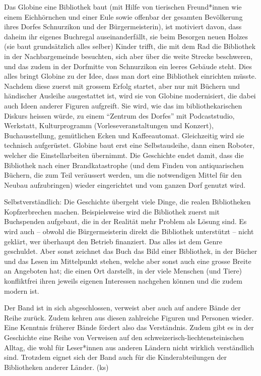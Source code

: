 \documentclass[a4paper,
fontsize=11pt,
oneside,
numbers=noperiodatend,
parskip=half-,
bibliography=totoc,
final
]{scrartcl}
\begin{document}
Das Globine eine Bibliothek baut (mit Hilfe von tierischen Freund*innen
wie einem Eichhörnchen und einer Eule sowie offenbar der gesamten
Bevölkerung ihres Dorfes Schnurzikon und der Bürgermeisterin), ist
motiviert davon, dass daheim ihr eigenes Buchregal auseinanderfällt, sie
beim Besorgen neuen Holzes (sie baut grundsätzlich alles selber) Kinder
trifft, die mit dem Rad die Bibliothek in der Nachbargemeinde besuchten,
sich aber über die weite Strecke beschweren, und das zudem in der
Dorfmitte von Schnurzikon ein leeres Gebäude steht. Dies alles bringt
Globine zu der Idee, dass man dort eine Bibliothek einrichten müsste.
Nachdem diese zuerst mit grossem Erfolg startet, aber nur mit Büchern
und händischer Ausleihe ausgestattet ist, wird sie von Globine
modernisiert, die dabei auch Ideen anderer Figuren aufgreift. Sie wird,
wie das im bibliothekarischen Diskurs heissen würde, zu einem
\enquote{Zentrum des Dorfes} mit Podcaststudio, Werkstatt,
Kulturprogramm (Vorleseveranstaltungen und Konzert), Buchausstellung,
gemütlichen Ecken und Kaffeeautomat. Gleichzeitig wird sie technisch
aufgerüstet. Globine baut erst eine Selbstausleihe, dann einen Roboter,
welcher die Einstellarbeiten übernimmt. Die Geschichte endet damit, dass
die Bibliothek nach einer Brandkatastrophe (und dem Finden von
antiquarischen Büchern, die zum Teil veräussert werden, um die
notwendigen Mittel für den Neubau aufzubringen) wieder eingerichtet und
vom ganzen Dorf genutzt wird.

Selbstverständlich: Die Geschichte übergeht viele Dinge, die realen
Bibliotheken Kopfzerbrechen machen. Beispielsweise wird die Bibliothek
zuerst mit Buchspenden aufgebaut, die in der Realität mehr Problem als
Lösung sind. Es wird auch -- obwohl die Bürgermeisterin direkt die
Bibliothek unterstützt -- nicht geklärt, wer überhaupt den Betrieb
finanziert. Das alles ist dem Genre geschuldet. Aber sonst zeichnet das
Buch das Bild einer Bibliothek, in der Bücher und das Lesen im
Mittelpunkt stehen, welche aber sonst auch eine grosse Breite an
Angeboten hat; die einen Ort darstellt, in der viele Menschen (und
Tiere) konfliktfrei ihren jeweils eigenen Interessen nachgehen können
und die zudem modern ist.

Der Band ist in sich abgeschlossen, verweist aber auch auf andere Bände
der Reihe zurück. Zudem kehren aus diesen zahlreiche Figuren und
Personen wieder. Eine Kenntnis früherer Bände fördert also das
Verständnis. Zudem gibt es in der Geschichte eine Reihe von Verweisen
auf den schweizerisch-liechtensteinischen Alltag, die wohl für
Leser*innen aus anderen Ländern nicht wirklich verständlich sind.
Trotzdem eignet sich der Band auch für die Kinderabteilungen der
Bibliotheken anderer Länder. (ks)

\end{document}
